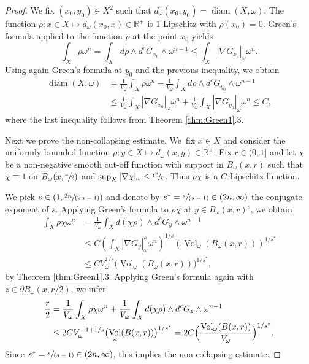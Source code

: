 \documentclass[10pt]{amsart}
\newcommand{\spfrac}[2]{\sfrac{#1}{(#2)}}
\DeclareMathOperator{\diam}{diam}
\DeclareMathOperator{\Vol}{Vol}
\theoremstyle{definition}
\begin{document}
\begin{proof}
We fix $(x_0,y_0)\in X^2$ such that $d_\omega(x_0,y_0)=\diam(X, \omega)$.
The function $\rho: x \in X \mapsto d_\omega(x_0, x) \in \mathbb{R}^+$ is $1$-Lipschitz
with $\rho(x_0)=0$. Green's formula applied to the function $\rho$ at the point $x_0$ yields
\[
\int_X \rho \omega^n =\int_X d \rho \wedge d^c G_{x_0} \wedge\omega^{n-1} \leq \int_X |\nabla G_{x_0}|_{\omega}\omega^n .
\]
Using again Green's formula at $y_0$ and the previous inequality, we obtain
\begin{align*}
\diam(X, \omega)
&= \frac{1}{V_\omega} \int_X \rho\omega^n - \frac{1}{V_\omega} \int_X d \rho \wedge d^c G_{y_0} \wedge\omega^{n-1}\\
&\leq  \frac{1}{V_\omega}\int_X |\nabla G_{x_0}|_{\omega}\omega^n
+\frac{1}{V_\omega}\int_X |\nabla G_{y_0}|_{\omega}\omega^n \leq C,
\end{align*}
where the last inequality follows from Theorem \ref{thm:Green1}.3.

Next we prove the non-collapsing estimate. We~fix $x \in X$ and consider the uniformly bounded function $\rho: y \in X \mapsto d_\omega(x, y) \in \mathbb{R}^+$.
Fix $r\in (0,1]$ and let $\chi$ be a non-negative smooth cut-off function with support in $B_\omega(x, r)$ such that
$\chi\equiv 1$ on $\overline{B}_\omega(x, \sfrac{r}{2}) $ and $\sup_X |\nabla \chi|_\omega \leq \sfrac{C}{r}$.
Thus $\rho \chi$ is a $C$-Lipschitz function.

We pick $s\in (1, \spfrac{2n}{2n-1})$ and denote by $s^*=\spfrac{s}{s-1} \in (2n, \infty)$ the conjugate exponent of $s$.
Applying Green's formula to $\rho \chi$ at $y\in \overline{B_{\omega}(x,r )}{}^c $, we obtain
\begin{align*}
\int_X \rho\chi \omega^n &= \frac{1}{V_\omega} \int_X d(\chi \rho) \wedge d^c G_y \wedge \omega^{n-1} \\
&\leq C
\left(\int_X |\nabla G_y|^s_\omega \omega^n\right)^{1/s} \left(\Vol_\omega(B_{\omega}(x,r)) \right)^{1/s^*}\\
&\leq CV_\omega^{1/s} \bigl(\Vol_\omega(B_{\omega}(x,r)) \bigr)^{1/s^*},
\end{align*}
by Theorem \ref{thm:Green1}.3.
Applying Green's formula again with $z\in \partial B_\omega(x, r/2)$, we infer
\begin{align*}
\frac{r}{2} &=\frac{1}{V_\omega} \int_X \rho\chi \omega^n
+ \frac{1}{V_\omega} \int_X d(\chi \rho) \wedge d^c G_z \wedge \omega^{n-1} \\
&\leq 2CV_\omega^{-1+1/s} \bigl(\Vol_\omega(B(x,r)) \bigr)^{1/s^*}= 2C\Bigl( \frac{\Vol_\omega(B(x,r)) }{V_\omega} \Bigr)^{1/s^*}.
\end{align*}
Since $s^*=\spfrac{s}{s-1}\in (2n, \infty)$, this implies the non-collapsing estimate.


\end{proof}
\end{document}
